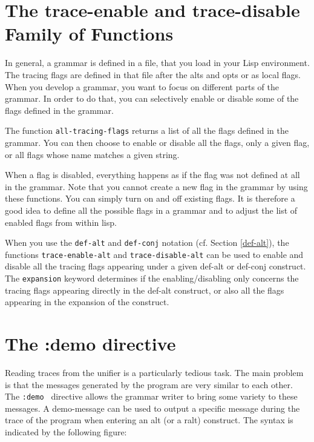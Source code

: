 \documentclass[10pt,a4paper]{report}
\begin{document}
\section{The trace-enable and trace-disable Family of Functions}


In general, a grammar is defined in a file, that you load in your Lisp
environment.  The tracing flags are defined in that file after the alts and
opts or as local flags.  When you develop a grammar, you want to focus on
different parts of the grammar.  In order to do that, you can selectively
enable or disable some of the flags defined in the grammar.  

The function {\tt all-tracing-flags} returns a list of all the flags defined
in the grammar.  You can then choose to enable or disable all the flags,
only a given flag, or all flags whose name matches a given string.  

When a flag is disabled, everything happens as if the flag was not defined
at all in the grammar.  Note that you cannot create a new flag in the
grammar by using these functions.  You can simply turn on and off existing
flags.  It is therefore a good idea to define all the possible flags in a
grammar and to adjust the list of enabled flags from within lisp.

When you use the {\tt def-alt} and {\tt def-conj} notation (cf. Section
\ref{def-alt}), the functions {\tt trace-enable-alt} and
{\tt trace-disable-alt} can be used to enable and disable all the tracing
flags appearing under a given def-alt or def-conj construct.  The
{\tt expansion} keyword determines if the enabling/disabling only concerns
the tracing flags appearing directly in the def-alt construct, or also all
the flags appearing in the expansion of the construct.



\section{The :demo directive}

Reading traces from the unifier is a particularly tedious task.  The main
problem is that the messages generated by the program are very similar to
each other.  The {\tt :demo	} directive allows the grammar writer to bring
some variety to these messages.  A demo-message can be used to output a
specific message during the trace of the program when entering an alt (or a
ralt) construct.  The syntax is indicated by the following figure:
\end{document}

